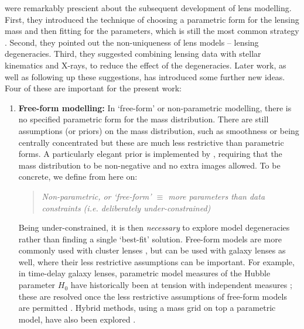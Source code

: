 \documentclass[galley,usenatbib]{mn2e}
\begin{document}
\cite{1981ApJ...244..736Y} were remarkably prescient about the subsequent
development of lens modelling.  First, they introduced the technique of
choosing a parametric form for the lensing mass and then fitting for the
parameters, which is still the most common strategy \citep[see for
example][]{2010GReGr..42.2151K,2011A&ARv..19...47K}.  Second, they pointed out
the non-uniqueness of lens models -- lensing degeneracies.  Third, they
suggested combining lensing data with stellar kinematics and X-rays, to reduce
the effect of the degeneracies.  Later work, as well as following up these
suggestions, has introduced some further new ideas.  Four of these are
important for the present work:
%
\begin{enumerate}
\item {\bf Free-form modelling:} In `free-form' or non-parametric
  modelling, there is no specified parametric form for the mass
  distribution.  There are still assumptions (or priors) on the mass
  distribution, such as smoothness or being centrally concentrated
  \citep{1997MNRAS.292..148S,2005MNRAS.360..477D,2009A&A...500..681M,2010ApJ...723.1678C}
  but these are much less restrictive than parametric forms.  A
  particularly elegant prior is implemented by
  \cite{2006MNRAS.367.1209L}, requiring that the mass distribution to
  be non-negative and no extra images allowed. To be concrete, we
  define from here on:
  
  \begin{quote}
  {\it Non-parametric, or `free-form' $\equiv$ more parameters than data constraints (i.e. deliberately under-constrained)}
  \end{quote}
  
  Being under-constrained, it is then {\it necessary} to explore model
  degeneracies rather than finding a single `best-fit'
  solution. Free-form models are more commonly used with cluster
  lenses
  \citep{2006ApJ...652L...5S,2009ApJ...690..154S,2009A&A...500..681M,2013arXiv1304.2393S},
  but can be used with galaxy lenses as well, where their less
  restrictive assumptions can be important.  For example, in
  time-delay galaxy lenses, parametric model measures of the Hubble parameter $H_0$ have historically been at 
  tension with independent measures 
  \citep[e.g.][]{2002astro.ph..4043K,2002ApJ...578...25K}; these are
  resolved once the less restrictive assumptions of free-form models
  are permitted \citep{2007ApJ...667..645R}.  Hybrid methods, using a
  mass grid on top a parametric model, have also been explored
  \citep[e.g.,][]{2010MNRAS.408.1969V}.


\end{enumerate}
\end{document}
